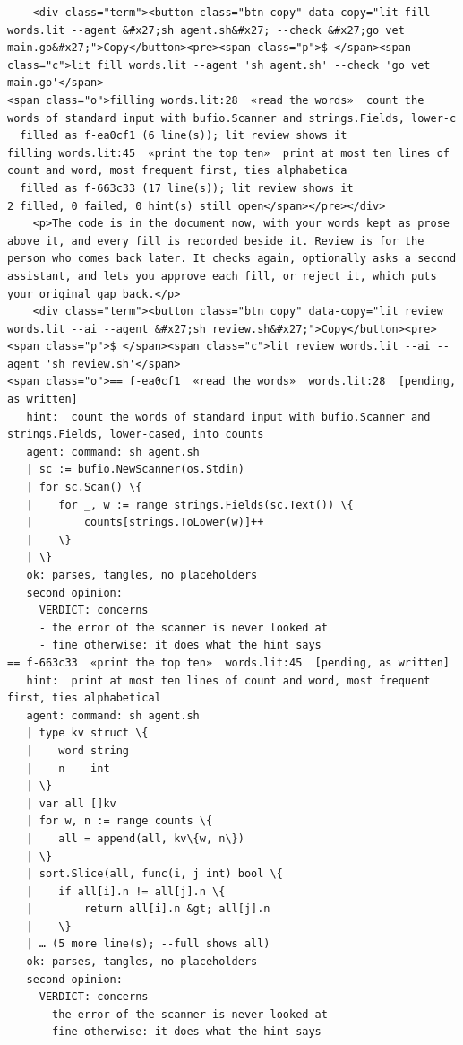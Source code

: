 \documentclass[10pt,a4paper]{article}
\begin{document}
\begin{Verbatim}
    <div class="term"><button class="btn copy" data-copy="lit fill words.lit --agent &#x27;sh agent.sh&#x27; --check &#x27;go vet main.go&#x27;">Copy</button><pre><span class="p">$ </span><span class="c">lit fill words.lit --agent 'sh agent.sh' --check 'go vet main.go'</span>
<span class="o">filling words.lit:28  «read the words»  count the words of standard input with bufio.Scanner and strings.Fields, lower-c
  filled as f-ea0cf1 (6 line(s)); lit review shows it
filling words.lit:45  «print the top ten»  print at most ten lines of count and word, most frequent first, ties alphabetica
  filled as f-663c33 (17 line(s)); lit review shows it
2 filled, 0 failed, 0 hint(s) still open</span></pre></div>
    <p>The code is in the document now, with your words kept as prose above it, and every fill is recorded beside it. Review is for the person who comes back later. It checks again, optionally asks a second assistant, and lets you approve each fill, or reject it, which puts your original gap back.</p>
    <div class="term"><button class="btn copy" data-copy="lit review words.lit --ai --agent &#x27;sh review.sh&#x27;">Copy</button><pre><span class="p">$ </span><span class="c">lit review words.lit --ai --agent 'sh review.sh'</span>
<span class="o">== f-ea0cf1  «read the words»  words.lit:28  [pending, as written]
   hint:  count the words of standard input with bufio.Scanner and strings.Fields, lower-cased, into counts
   agent: command: sh agent.sh
   | sc := bufio.NewScanner(os.Stdin)
   | for sc.Scan() \{
   | 	for _, w := range strings.Fields(sc.Text()) \{
   | 		counts[strings.ToLower(w)]++
   | 	\}
   | \}
   ok: parses, tangles, no placeholders
   second opinion:
     VERDICT: concerns
     - the error of the scanner is never looked at
     - fine otherwise: it does what the hint says
== f-663c33  «print the top ten»  words.lit:45  [pending, as written]
   hint:  print at most ten lines of count and word, most frequent first, ties alphabetical
   agent: command: sh agent.sh
   | type kv struct \{
   | 	word string
   | 	n    int
   | \}
   | var all []kv
   | for w, n := range counts \{
   | 	all = append(all, kv\{w, n\})
   | \}
   | sort.Slice(all, func(i, j int) bool \{
   | 	if all[i].n != all[j].n \{
   | 		return all[i].n &gt; all[j].n
   | 	\}
   | … (5 more line(s); --full shows all)
   ok: parses, tangles, no placeholders
   second opinion:
     VERDICT: concerns
     - the error of the scanner is never looked at
     - fine otherwise: it does what the hint says


\end{Verbatim}
\end{document}
